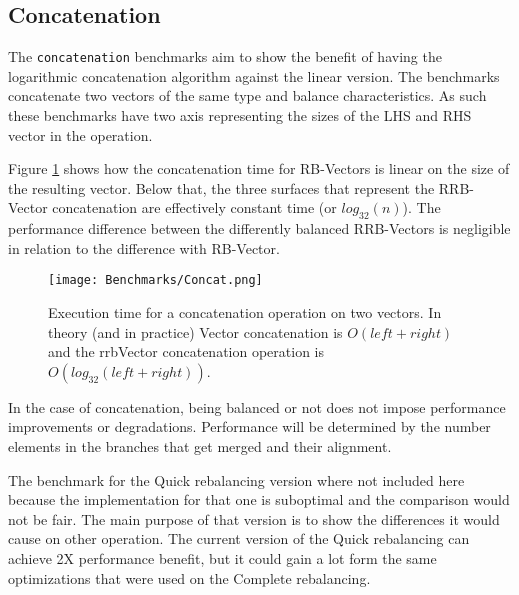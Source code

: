 \FloatBarrier

\subsection{Concatenation}
The \texttt{concatenation} benchmarks aim to show the benefit of having the logarithmic concatenation algorithm against the linear version. The benchmarks concatenate two vectors of the same type and balance characteristics. As such these benchmarks have two axis representing the sizes of the LHS and RHS vector in the operation.



Figure \ref{ConcatBenchmarks} shows how the concatenation time for RB-Vectors is linear on the size of the resulting vector. Below that, the three surfaces that represent the RRB-Vector concatenation are effectively constant time (or $log_{32}(n)$). The performance difference between the differently balanced RRB-Vectors is negligible in relation to the difference with RB-Vector. 

\begin{figure}[h!]
  \centering
  \texttt{[image: Benchmarks/Concat.png]}
  \caption{Execution time for a concatenation operation on two vectors. In theory (and in practice) Vector concatenation is $O(left + right)$ and the rrbVector concatenation operation is $O(log_{32}(left + right))$.}
   \label{ConcatBenchmarks}
\end{figure}

In the case of concatenation, being balanced or not does not impose performance improvements or degradations. Performance will be determined by the number elements in the branches that get merged and their alignment.

The benchmark for the Quick rebalancing version where not included here because the implementation for that one is suboptimal and the comparison would not be fair. The main purpose of that version is to show the differences it would cause on other operation. The current version of the Quick rebalancing can achieve 2X performance benefit, but it could gain a lot form the same optimizations that were used on the Complete rebalancing.

\FloatBarrier


